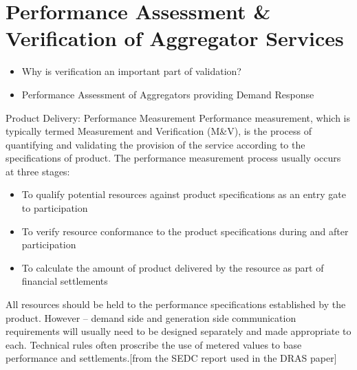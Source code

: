 \chapter{Performance Assessment \& Verification of Aggregator Services} %
\label{cha:verification}

\begin{itemize}
	\item Why is verification an important part of validation?
	\item Performance Assessment of Aggregators providing Demand Response
\end{itemize}


Product Delivery: Performance Measurement 
Performance measurement, which is typically termed Measurement and Verification (M\&V), is the process of quantifying and validating the provision of the service according to the specifications of product. The performance measurement process usually occurs at three stages: 
\begin{itemize}
	\item To qualify potential resources against product specifications as an entry gate to participation 
	\item To verify resource conformance to the product specifications during and after participation 
	\item To calculate the amount of product delivered by the resource as part of financial settlements
\end{itemize}
 
All resources should be held to the performance specifications established by the product. However – demand side and generation side communication requirements will usually need to be designed separately and made appropriate to each. Technical rules often proscribe the use of metered values to base performance and settlements.[from the SEDC report used in the DRAS paper]



